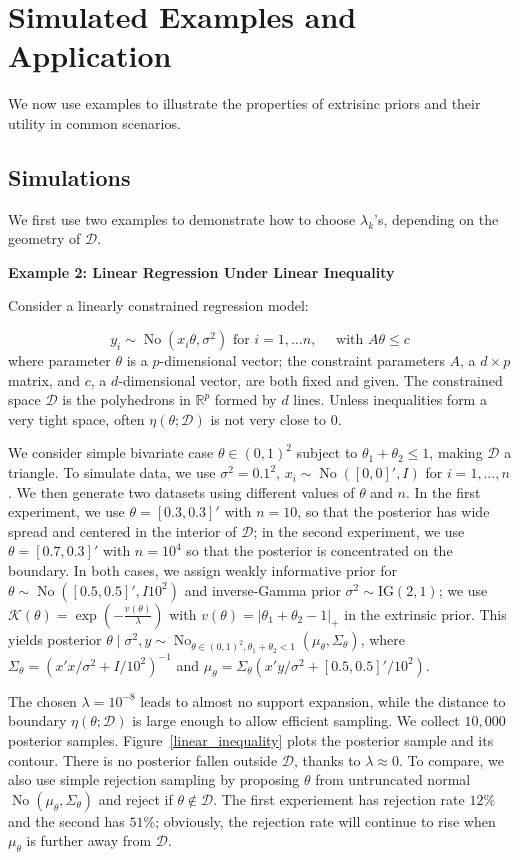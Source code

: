 \documentclass[10pt]{article}
\newcommand{\bb}[1]{\mathbb{#1}}
\newcommand{\mc}[1]{\mathcal{#1}}
\DeclareMathOperator{\No}{No}
\DeclareMathOperator{\1}{\mathbbm{1}}
\begin{document}
\section{Simulated Examples and Application}

We now use examples to illustrate the properties of extrisinc priors and their utility in common scenarios.

\subsection{Simulations}

We first use two examples to demonstrate how to choose $\lambda_{k}$'s, depending on the geometry of $\mc D$.

{\bf Example 2: Linear Regression Under Linear Inequality}

Consider a linearly constrained regression model:

$$y_i \sim \No (x_i \theta, \sigma^2) \text{ for } i=1,\ldots n, \quad\text{ with } A\theta \le c$$
where parameter $\theta$ is a $p$-dimensional vector; the constraint parameters $A$, a $d\times p$ matrix, and $c$, a $d$-dimensional vector, are both fixed and given. The constrained space  $\mc D$ is the polyhedrons in $\bb R^p$ formed by $d$ lines. Unless inequalities form a very tight space, often $\eta(\theta;\mc D)$ is not very close to $0$. 

We consider simple bivariate case $\theta \in (0,1)^2$ subject to $\theta_1+\theta_2\le 1$, making $\mc D$ a triangle. To simulate data, we use $\sigma^2=0.1^2$, $x_i\sim \No([0,0]',I)$ for $i=1,\ldots,n$. We then generate two datasets using different values of $\theta$ and $n$. In the first experiment, we use $\theta=[0.3,0.3]'$ with $n=10$, so that the posterior has wide spread and centered in the interior of $\mc D$; in the second experiment, we use $\theta=[0.7,0.3]'$ with $n=10^4$ so that the posterior is concentrated on the boundary. In both cases, we assign weakly informative prior for $\theta\sim \No([0.5, 0.5]',I10^2)$ and inverse-Gamma prior $\sigma^2\sim \text{IG}(2,1)$; we use $\mc K(\theta)=\exp( - \frac{v(\theta)}{\lambda})$ with $v(\theta)=|\theta_1+\theta_2-1|_{+}$ in the extrinsic prior. This yields posterior $\theta\mid \sigma^2,y \sim \No_{\theta\in(0,1)^2,\theta_1+\theta_2<1} \left( \mu_\theta, \Sigma_\theta\right)$, where $\Sigma_\theta=(x'x/\sigma^2+I/10^2)^{-1}$ and $\mu_\theta= \Sigma_\theta(x'y/\sigma^2 + [0.5,0.5]'/10^2)$. 

The chosen $\lambda=10^{-8}$ leads to almost no support expansion, while the distance to boundary $\eta(\theta;\mc D)$ is large enough to allow efficient sampling. We collect $10,000$ posterior samples. Figure~\ref{linear_inequality} plots the posterior sample and its contour. There is no posterior fallen outside $\mc D$, thanks to $\lambda\approx 0$. To compare, we also use simple rejection sampling by proposing $\theta$ from untruncated normal $\No \left( \mu_\theta, \Sigma_\theta\right)$ and reject if $\theta\not\in \mc D$. The first experiement has rejection rate $12\%$  and the second has $51\%$; obviously, the rejection rate will continue to rise when $\mu_\theta$ is further away from $\mc D$.
\end{document}
